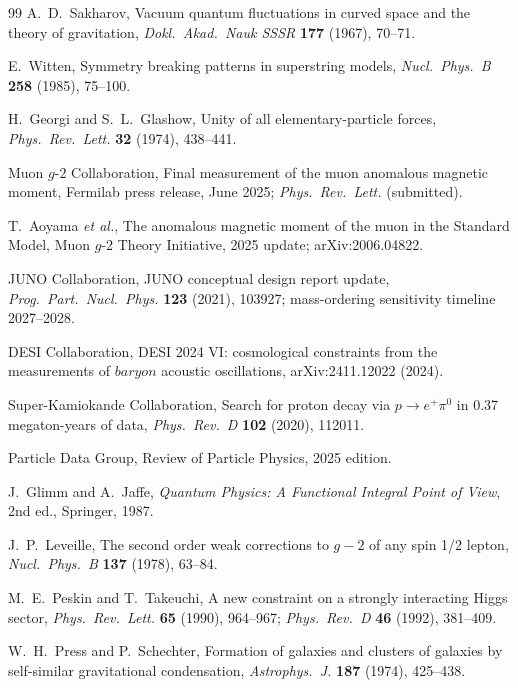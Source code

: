 \documentclass[aps,prd,onecolumn,amsmath,amssymb,nofootinbib,11pt]{revtex4-2}
\numberwithin{equation}{section}
\theoremstyle{plain}
\theoremstyle{definition}
\theoremstyle{remark}
\begin{document}
\begin{thebibliography}{99}
A.~D.~Sakharov,
Vacuum quantum fluctuations in curved space and the theory of gravitation,
\emph{Dokl.\ Akad.\ Nauk SSSR} \textbf{177} (1967), 70--71.

E.~Witten,
Symmetry breaking patterns in superstring models,
\emph{Nucl.\ Phys.\ B} \textbf{258} (1985), 75--100.

H.~Georgi and S.~L.~Glashow,
Unity of all elementary-particle forces,
\emph{Phys.\ Rev.\ Lett.} \textbf{32} (1974), 438--441.

Muon $g$-2 Collaboration,
Final measurement of the muon anomalous magnetic moment,
Fermilab press release, June 2025;
\emph{Phys.\ Rev.\ Lett.} (submitted).

T.~Aoyama \emph{et al.},
The anomalous magnetic moment of the muon in the Standard Model,
Muon $g$-2 Theory Initiative, 2025 update;
arXiv:2006.04822.

JUNO Collaboration,
JUNO conceptual design report update,
\emph{Prog.\ Part.\ Nucl.\ Phys.} \textbf{123} (2021), 103927;
mass-ordering sensitivity timeline 2027--2028.

DESI Collaboration,
DESI 2024 VI: cosmological constraints from the measurements of
$baryon$ acoustic oscillations,
arXiv:2411.12022 (2024).

Super-Kamiokande Collaboration,
Search for proton decay via $p\to e^+\pi^0$ in 0.37 megaton-years of data,
\emph{Phys.\ Rev.\ D} \textbf{102} (2020), 112011.

Particle Data Group,
Review of Particle Physics, 2025 edition.

J.~Glimm and A.~Jaffe,
\emph{Quantum Physics: A Functional Integral Point of View},
2nd ed., Springer, 1987.

J.~P.~Leveille,
The second order weak corrections to $g-2$ of any spin 1/2 lepton,
\emph{Nucl.\ Phys.\ B} \textbf{137} (1978), 63--84.

M.~E.~Peskin and T.~Takeuchi,
A new constraint on a strongly interacting Higgs sector,
\emph{Phys.\ Rev.\ Lett.} \textbf{65} (1990), 964--967;
\emph{Phys.\ Rev.\ D} \textbf{46} (1992), 381--409.

W.~H.~Press and P.~Schechter,
Formation of galaxies and clusters of galaxies by self-similar gravitational
condensation,
\emph{Astrophys.\ J.} \textbf{187} (1974), 425--438.

\end{thebibliography}
\end{document}
